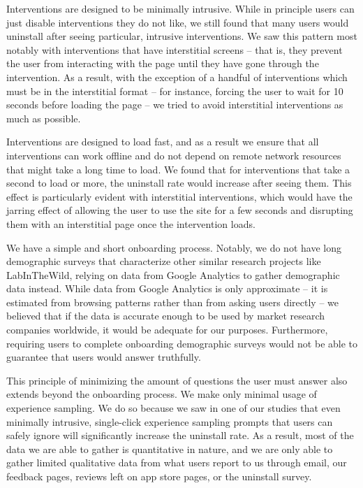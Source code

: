 Interventions are designed to be minimally intrusive. While in principle users can just disable interventions they do not like, we still found that many users would uninstall after seeing particular, intrusive interventions. We saw this pattern most notably with interventions that have interstitial screens -- that is, they prevent the user from interacting with the page until they have gone through the intervention. As a result, with the exception of a handful of interventions which must be in the interstitial format -- for instance, forcing the user to wait for 10 seconds before loading the page -- we tried to avoid interstitial interventions as much as possible.

Interventions are designed to load fast, and as a result we ensure that all interventions can work offline and do not depend on remote network resources that might take a long time to load. We found that for interventions that take a second to load or more, the uninstall rate would increase after seeing them. This effect is particularly evident with interstitial interventions, which would have the jarring effect of allowing the user to use the site for a few seconds and disrupting them with an interstitial page once the intervention loads.

We have a simple and short onboarding process. Notably, we do not have long demographic surveys that characterize other similar research projects like LabInTheWild, relying on data from Google Analytics to gather demographic data instead. While data from Google Analytics is only approximate -- it is estimated from browsing patterns rather than from asking users directly -- we believed that if the data is accurate enough to be used by market research companies worldwide, it would be adequate for our purposes. Furthermore, requiring users to complete onboarding demographic surveys would not be able to guarantee that users would answer truthfully.

This principle of minimizing the amount of questions the user must answer also extends beyond the onboarding process. We make only minimal usage of experience sampling. We do so because we saw in one of our studies that even minimally intrusive, single-click experience sampling prompts that users can safely ignore will significantly increase the uninstall rate. As a result, most of the data we are able to gather is quantitative in nature, and we are only able to gather limited qualitative data from what users report to us through email, our feedback pages, reviews left on app store pages, or the uninstall survey.

